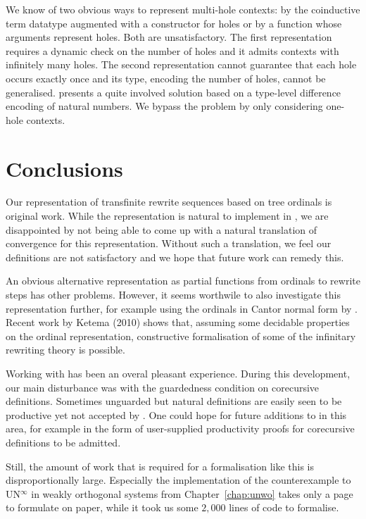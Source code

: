 We know of two obvious ways to represent multi-hole contexts:
by the coinductive term datatype augmented with a constructor for
holes or by a function whose arguments represent holes.
Both are unsatisfactory. The first representation requires a dynamic
check on the number of holes and it admits contexts with infinitely
many holes. The second representation cannot guarantee
that each hole occurs exactly once and its type, encoding the number of
holes, cannot be generalised. \citet{lindley-08} presents a quite
involved solution based on a type-level difference encoding of natural
numbers. We bypass the problem by only considering one-hole contexts.


\section{Conclusions}

Our representation of transfinite rewrite sequences based on tree
ordinals is original work. While the representation is natural to
implement in \Coq, we are disappointed by not being able to come up
with a natural translation of convergence for this
representation. Without such a translation, we feel our definitions
are not satisfactory and we hope that future work can remedy this.


An obvious alternative representation as partial functions from
ordinals to rewrite steps has other problems. However, it seems
worthwile to also investigate this representation further, for example
using the ordinals in Cantor normal form by
\citet{casteran-06}. Recent work by Ketema (2010) shows that, assuming
some decidable properties on the ordinal representation, constructive
formalisation of some of the infinitary rewriting theory is possible.

Working with \Coq has been an overal pleasant experience. During this
development, our main disturbance was with the guardedness condition
on corecursive definitions. Sometimes unguarded but natural
definitions are easily seen to be productive yet not accepted by
\Coq. One could hope for future additions to \Coq in this area, for
example in the form of user-supplied productivity proofs for
corecursive definitions to be admitted.

Still, the amount of work that is required for a formalisation like
this is disproportionally large. Especially the implementation of the
counterexample to UN$^\infty$ in weakly orthogonal systems from
Chapter~\ref{chap:unwo} takes only a page to formulate on paper, while
it took us some $2,000$ lines of \Coq code to formalise.


